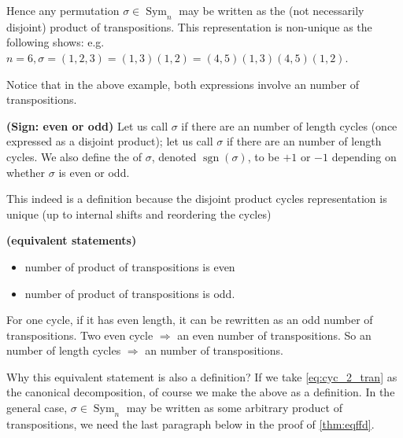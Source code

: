 \documentclass{article}
\newcommand{\bfs}[1]{\textbf{({#1}) }}
\begin{document}
Hence any permutation $\sigma \in \operatorname{Sym}_{n}$ may be written as the (not necessarily disjoint) product of transpositions. This representation is non-unique as the following shows:
e.g. $n=6, \sigma=(1, 2, 3)=(1,3)(1,2)=(4,5)(1,3)(4,5)(1,2)$.
\begin{rema}
Notice that in the above example, both expressions involve an  number of transpositions.
\end{rema}

\begin{defa}{\bfs{Sign: even or odd}}
Let us call $\sigma$  if there are an  number of  length cycles (once expressed as a disjoint product); let us call $\sigma$  if there are an  number of  length cycles. We also define the  of $\sigma$, denoted $\operatorname{sgn}(\sigma)$, to be $+1$ or $-1$ depending on whether $\sigma$ is even or odd.
\end{defa} 
\begin{rema}
This indeed is a definition because the disjoint product cycles representation is unique (up to internal shifts and reordering the cycles)
\end{rema}
\begin{rema}{\bfs{equivalent statements}}
\begin{itemize}
    \item{} number of product of transpositions is even
    \item {} number of product of transpositions is odd.
\end{itemize}
For one cycle, if it has even length, it can be rewritten as an odd number of transpositions.
Two even cycle $\Rightarrow$ an even number of transpositions. So an  number of  length cycles $\Rightarrow$ an  number of transpositions.

Why this equivalent statement is also a definition?  If we take \cref{eq:cyc_2_tran} as the canonical decomposition, of course we make the above as a definition. In the general case, $\sigma \in \operatorname{Sym}_{n}$ may be written as some arbitrary product of  transpositions, we need the last paragraph below in the proof of \cref{thm:eqffd}.
\end{rema}
\end{document}
